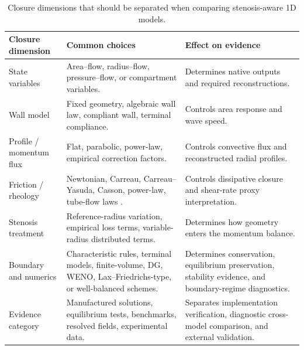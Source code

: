 \begin{table}[!htb]
    \centering
    \scriptsize
    \caption{Closure dimensions that should be separated when comparing
    stenosis-aware 1D models.}
    \label{tab:one-dimensional-closure-review}
    \begin{tabularx}{\textwidth}{@{}
        >{\raggedright\arraybackslash}p{}
        >{\raggedright\arraybackslash}p{}
        >{\raggedright\arraybackslash}X@{}}
        \toprule
        \textbf{Closure dimension} & \textbf{Common choices} & \textbf{Effect on evidence} \\
        \midrule
        State variables
            & Area--flow, radius--flow, pressure--flow, or compartment variables.
            & Determines native outputs and required reconstructions. \\
        Wall model
            & Fixed geometry, algebraic wall law, compliant wall, terminal compliance.
            & Controls area response and wave speed. \\
        Profile / momentum flux
            & Flat, parabolic, power-law, empirical correction factors.
            & Controls convective flux and reconstructed radial profiles. \\
        Friction / rheology
            & Newtonian, Carreau, Carreau--Yasuda, Casson, power-law, tube-flow laws
            \cite{PriesEtAl1992BloodViscosityTubeFlow,KumarEtAl2019CarreauYasudaHemodynamics,LiuEtAl2021ICASRheology}.
            & Controls dissipative closure and shear-rate proxy interpretation. \\
        Stenosis treatment
            & Reference-radius variation, empirical loss terms, variable-radius
            distributed terms.
            & Determines how geometry enters the momentum balance. \\
        Boundary and numerics
            & Characteristic rules, terminal models, finite-volume, DG, WENO,
            Lax--Friedrichs-type, or well-balanced schemes.
            & Determines conservation, equilibrium preservation, stability evidence,
            and boundary-regime diagnostics. \\
        Evidence category
            & Manufactured solutions, equilibrium tests, benchmarks, resolved fields,
            experimental data.
            & Separates implementation verification, diagnostic cross-model comparison,
            and external validation. \\
        \bottomrule
    \end{tabularx}
\end{table}
